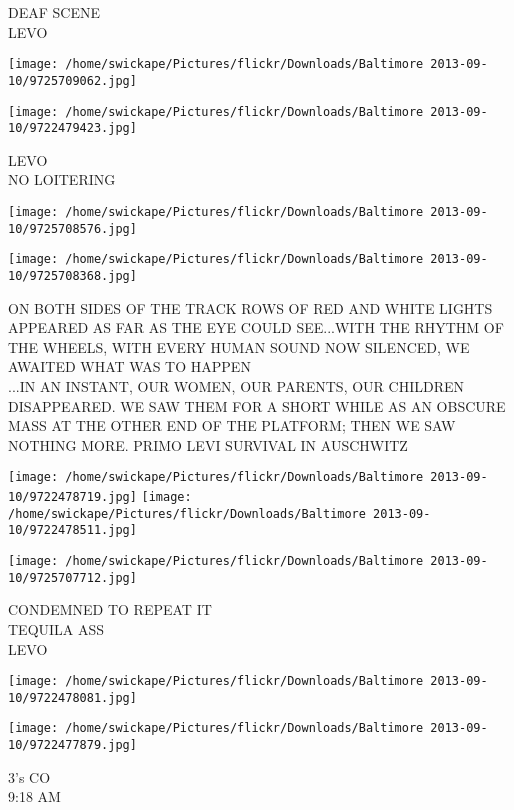 \documentclass[10pt,letterpaper]{article}
\begin{document}
DEAF SCENE\\
LEVO\\
\pagebreak

\texttt{[image: /home/swickape/Pictures/flickr/Downloads/Baltimore 2013-09-10/9725709062.jpg]}

\vspace{0.25in}
\texttt{[image: /home/swickape/Pictures/flickr/Downloads/Baltimore 2013-09-10/9722479423.jpg]}

LEVO\\
NO LOITERING\\
\pagebreak

\texttt{[image: /home/swickape/Pictures/flickr/Downloads/Baltimore 2013-09-10/9725708576.jpg]}

\vspace{0.25in}
\texttt{[image: /home/swickape/Pictures/flickr/Downloads/Baltimore 2013-09-10/9725708368.jpg]}

ON BOTH SIDES OF THE TRACK ROWS OF RED AND WHITE LIGHTS APPEARED AS FAR AS THE EYE COULD SEE...WITH THE RHYTHM OF THE WHEELS, WITH EVERY HUMAN SOUND NOW SILENCED, WE AWAITED WHAT WAS TO HAPPEN\\
...IN AN INSTANT, OUR WOMEN, OUR PARENTS, OUR CHILDREN DISAPPEARED.  WE SAW THEM FOR A SHORT WHILE AS AN OBSCURE MASS AT THE OTHER END OF THE PLATFORM; THEN WE SAW NOTHING MORE.  PRIMO LEVI  SURVIVAL IN AUSCHWITZ\\
\pagebreak

\texttt{[image: /home/swickape/Pictures/flickr/Downloads/Baltimore 2013-09-10/9722478719.jpg]}
\texttt{[image: /home/swickape/Pictures/flickr/Downloads/Baltimore 2013-09-10/9722478511.jpg]}

\texttt{[image: /home/swickape/Pictures/flickr/Downloads/Baltimore 2013-09-10/9725707712.jpg]}

CONDEMNED TO REPEAT IT\\
TEQUILA ASS\\
LEVO\\
\pagebreak

\texttt{[image: /home/swickape/Pictures/flickr/Downloads/Baltimore 2013-09-10/9722478081.jpg]}

\vspace{0.25in}
\texttt{[image: /home/swickape/Pictures/flickr/Downloads/Baltimore 2013-09-10/9722477879.jpg]}

3's CO\\
9:18 AM\\
\pagebreak
\end{document}

